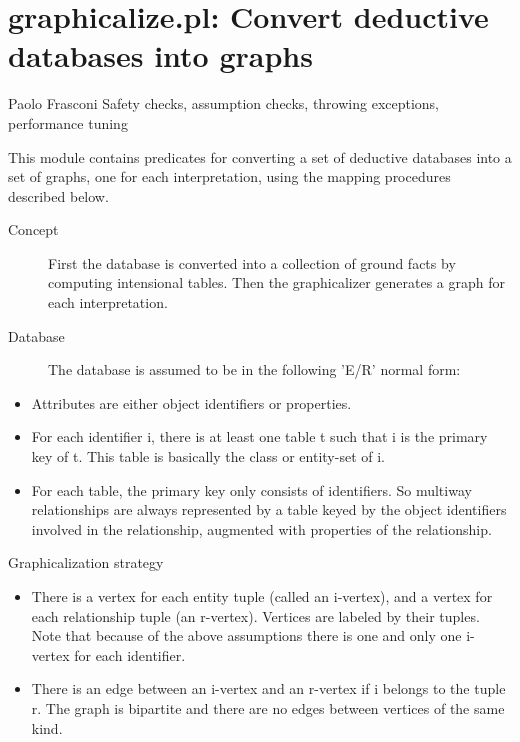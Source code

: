 


\section{graphicalize.pl: Convert deductive databases into graphs}

\label{sec:graphicalize}

\begin{tags}
Paolo Frasconi
Safety checks, assumption checks, throwing exceptions, performance tuning
\end{tags}

This module contains predicates for converting a set of deductive
databases into a set of graphs, one for each interpretation, using
the mapping procedures described below.

\begin{description}
    \item[Concept] 
First the database is converted into a collection of ground facts by
computing intensional tables. Then the graphicalizer generates a
graph for each interpretation.
    \item[Database] 
The database is assumed to be in the following 'E/R' normal form:
\end{description}

\begin{itemize}
    \item Attributes are either object identifiers or properties.
    \item For each identifier i, there is at least one table t such that i
is the primary key of t. This table is basically the class or
entity-set of i.
    \item For each table, the primary key only consists of identifiers. So
multiway relationships are always represented by a table keyed by
the object identifiers involved in the relationship, augmented
with properties of the relationship.
\end{itemize}

\begin{description}
    \item[Graphicalization strategy] 
\end{description}

\begin{itemize}
    \item There is a vertex for each entity tuple (called an i-vertex), and
a vertex for each relationship tuple (an r-vertex). Vertices are
labeled by their tuples. Note that because of the above assumptions
there is one and only one i-vertex for each identifier.
    \item There is an edge between an i-vertex and an r-vertex if i belongs
to the tuple r. The graph is bipartite and there are no edges
between vertices of the same kind.
\end{itemize}

